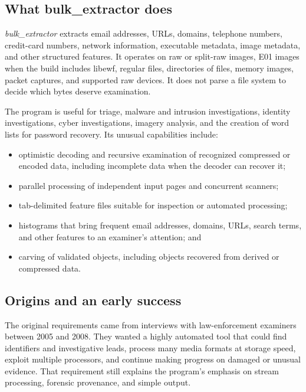 \documentclass[11pt]{article}
\newcommand{\bulk}{\textit{bulk\_extractor}\xspace}
\begin{document}
\subsection{What bulk\_extractor does}

\bulk extracts email addresses, URLs, domains, telephone numbers, credit-card
numbers, network information, executable metadata, image metadata, and other
structured features. It operates on raw or split-raw images, E01 images when
the build includes libewf, regular files, directories of files, memory images,
packet captures, and supported raw devices. It does not parse a file system to
decide which bytes deserve examination.

The program is useful for triage, malware and intrusion investigations,
identity investigations, cyber investigations, imagery analysis, and the
creation of word lists for password recovery. Its unusual capabilities
include:

\begin{itemize}
\item optimistic decoding and recursive examination of recognized compressed
  or encoded data, including incomplete data when the decoder can recover it;
\item parallel processing of independent input pages and concurrent scanners;
\item tab-delimited feature files suitable for inspection or automated
  processing;
\item histograms that bring frequent email addresses, domains, URLs, search
  terms, and other features to an examiner's attention; and
\item carving of validated objects, including objects recovered from derived
  or compressed data.
\end{itemize}

\subsection{Origins and an early success}

The original requirements came from interviews with law-enforcement examiners
between 2005 and 2008. They wanted a highly automated tool that could find
identifiers and investigative leads, process many media formats at storage
speed, exploit multiple processors, and continue making progress on damaged or
unusual evidence. That requirement still explains the program's emphasis on
stream processing, forensic provenance, and simple output.
\end{document}
